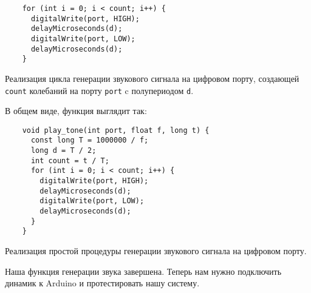 \documentclass[../sparc.tex]{subfiles}
\begin{document}
\begin{listing}[H]
  \begin{verbatim}
    for (int i = 0; i < count; i++) {
      digitalWrite(port, HIGH);
      delayMicroseconds(d);
      digitalWrite(port, LOW);
      delayMicroseconds(d);
    }
  \end{verbatim}
  \label{listing:play-tone-cycle}
  \caption{Реализация цикла генерации звукового сигнала на цифровом порту,
    создающей \texttt{count} колебаний на порту \texttt{port} c полупериодом
    \texttt{d}.}
\end{listing}

В общем виде, функция выглядит так:

\begin{listing}[H]
  \begin{verbatim}
    void play_tone(int port, float f, long t) {
      const long T = 1000000 / f;
      long d = T / 2;
      int count = t / T;
      for (int i = 0; i < count; i++) {
        digitalWrite(port, HIGH);
        delayMicroseconds(d);
        digitalWrite(port, LOW);
        delayMicroseconds(d);
      }
    }
  \end{verbatim}
  \label{listing:play-tone-procedure}
  \caption{Реализация простой процедуры генерации звукового сигнала на цифровом
    порту.}
\end{listing}

Наша функция генерации звука завершена. Теперь нам нужно подключить динамик к
Arduino и протестировать нашу систему.

\end{document}
